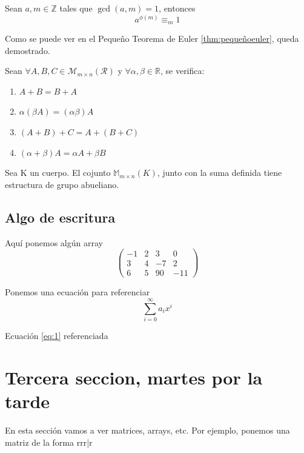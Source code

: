 \documentclass[10pt,a4paper]{article}
\begin{document}
\begin{teorema} \label{thm:pequeñoeuler}
	Sean $a,m\in \mathbb{Z}$ tales que $\gcd(a, m)=1$, entonces \[a^{\phi(m)}\equiv_m1\]
\end{teorema}

Como se puede ver en el Pequeño Teorema de Euler \ref{thm:pequeñoeuler}, queda demostrado.

\begin{teorema}
	Sean $\forall A, B, C\in \mathcal{M}_{m\times n}(\mathcal{R})$ y $\forall \alpha, \beta\in \mathbb{R}$, se verifica:
	\begin{multicols}{2}
		\begin{enumerate} 
			\item $A+B=B+A$
			\item $\alpha(\beta A)=(\alpha \beta)A$
			\item $(A+B)+C=A+(B+C)$
			\item $(\alpha+\beta)A=\alpha A + \beta B$
		\end{enumerate}
	\end{multicols}
\end{teorema}


\begin{lema}
	Sea K un cuerpo. El cojunto $\mathbb{M}_{m\times n}(K)$, junto con la suma definida tiene estructura de grupo abueliano.
\end{lema}


\subsection[Escritura]{Algo de escritura}
Aquí ponemos algún array
\[
\left (
\begin{array}{rrr|r} 
	-1 & 2 &  3 &   0 \\ 
	3 & 4 & -7 &   2\\
	6 & 5 & 90 & -11
\end{array} 
\right )
\]

Ponemos una ecuación para referenciar
\begin{equation} \label{eq:1} 
	\sum_{i=0}^{\infty} a_i x^i
\end{equation}

Ecuación \ref{eq:1} referenciada


\section[Martes tarde]{Tercera seccion, martes por la tarde}
En esta sección vamos a ver matrices, arrays, etc.
Por ejemplo, ponemos una matriz de la forma rrr|r
\end{document}
